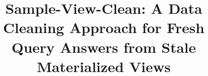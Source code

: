 \documentclass{sig-alternate}
\begin{document}
\setlength{\belowdisplayskip}{2pt} \setlength{\belowdisplayshortskip}{2pt}
\setlength{\abovedisplayskip}{2pt} \setlength{\abovedisplayshortskip}{2pt}
\setlength{\belowcaptionskip}{-8pt}
\selectfont

\newtheorem{theorem}{Theorem}
\newtheorem{example}{Example}
\newtheorem{definition}{Definition}
\newtheorem{proposition}{Proposition}
\newtheorem{lemma}{Lemma}
\newtheorem{corollary}{Corollary}

\newcommand{\cond}{\textrm{Cond}\xspace}
\newcommand{\dataset}{data set\xspace}
\newcommand{\datasets}{data sets\xspace}
\newcommand{\spview}{\textsf{SPView}\xspace}
\newcommand{\fjview}{\textsf{FJView}\xspace}
\newcommand{\aggview}{\textsf{AggView}\xspace}
\newcommand{\hashfunc}[1]{\textsf{hashfunc}(#1)\xspace}

\newcommand{\avgfunc}{\ensuremath{\texttt{avg} }\xspace}
\newcommand{\maxfunc}{\ensuremath{\texttt{max} }\xspace}
\newcommand{\countfunc}{\ensuremath{\texttt{count}}\xspace}
\newcommand{\sumfunc}{\ensuremath{\texttt{sum} }\xspace}
\newcommand{\havingfunc}{\ensuremath{\texttt{HAVING} }\xspace}
\newcommand{\ratio}{\ensuremath{\rho }\xspace}


\newcommand{\insertion}{\ensuremath{\texttt{INSERT} }\xspace}
\newcommand{\update}{\ensuremath{\texttt{UPDATE} }\xspace}
\newcommand{\delete}{\ensuremath{\texttt{DELETE} }\xspace}


\newcommand{\tbl}[1]{\textsf{#1}\xspace}
\newcommand{\field}[1]{\textsf{#1}\xspace}
\newcommand{\cost}{\textrm{cost}\xspace}
\newcommand{\ans}{\textsf{ans}\xspace}
\newcommand{\dans}{\Delta\textsf{ans}\xspace}
\newcommand{\cqp}{correction query processing\xspace}
\newcommand{\Cqp}{Correction query processing\xspace}

\newcommand{\reminder}[1]{{{\textcolor{magenta}{\{\{\bf #1\}\}}}\xspace}}
\newcommand{\specialcell}[2][c]{%
  \begin{tabular}[#1]{@{}c@{}}#2\end{tabular}}

\pagestyle{plain}

\title{Sample-View-Clean: A Data Cleaning Approach for Fresh Query Answers from Stale Materialized Views}
\end{document}
